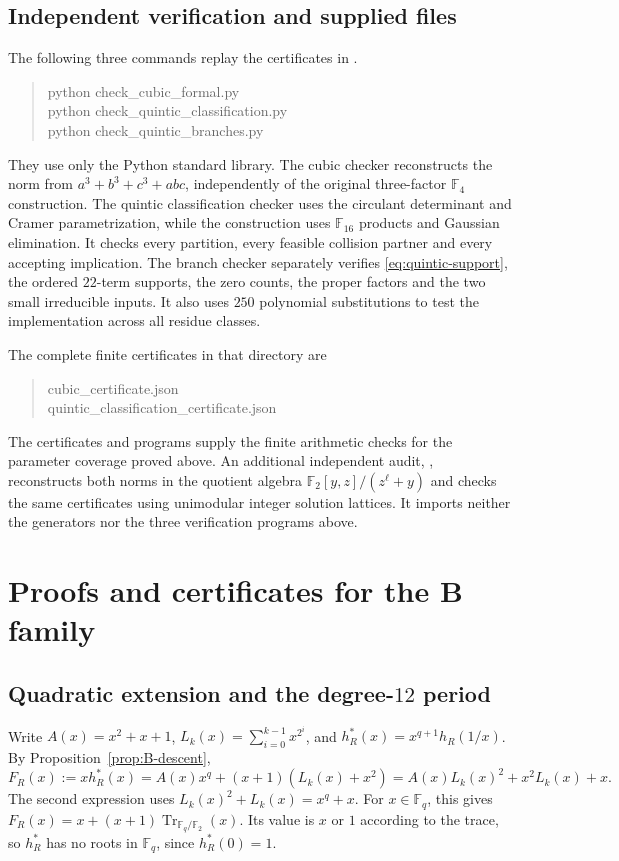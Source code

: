 \documentclass[11pt]{article}
\theoremstyle{definition}
\theoremstyle{remark}
\begin{document}
\begin{samepage}
\subsection{Independent verification and supplied files}
The following three commands replay the certificates in .
\begin{quote}\small\ttfamily
python check\_cubic\_formal.py\\
python check\_quintic\_classification.py\\
python check\_quintic\_branches.py
\end{quote}
\end{samepage}
They use only the Python standard library.
The cubic checker reconstructs the norm from
$a^3+b^3+c^3+abc$, independently of the original
three-factor $\mathbb F_4$ construction.
The quintic classification checker uses the circulant determinant
and Cramer parametrization, while the construction uses
$\mathbb F_{16}$ products and Gaussian elimination.
It checks every partition, every feasible collision partner and
every accepting implication.
The branch checker separately verifies
\eqref{eq:quintic-support}, the ordered $22$-term supports,
the zero counts, the proper factors and the two small irreducible
inputs. It also uses $250$ polynomial substitutions to test the
implementation across all residue classes.

The complete finite certificates in that directory are
\begin{quote}\small\ttfamily
cubic\_certificate.json\\
quintic\_classification\_certificate.json
\end{quote}
The certificates and programs supply the finite arithmetic checks
for the parameter coverage proved above.
An additional independent audit, ,
reconstructs both norms in the quotient algebra
$\mathbb F_2[y,z]/(z^\ell+y)$ and checks the same certificates using
unimodular integer solution lattices. It imports neither the generators
nor the three verification programs above.


\section{Proofs and certificates for the B family}\label{sec:B-certificates}

\subsection{Quadratic extension and the degree-\texorpdfstring{$12$}{12} period}
Write $A(x)=x^2+x+1$, $L_k(x)=\sum_{i=0}^{k-1}x^{2^i}$,
and $h_R^*(x)=x^{q+1}h_R(1/x)$. By Proposition~\ref{prop:B-descent},
\begin{equation}\label{eq:B-reciprocal}
 F_R(x):=x h_R^*(x)=A(x)x^q+(x+1)(L_k(x)+x^2)
                  =A(x)L_k(x)^2+x^2L_k(x)+x.
\end{equation}
The second expression uses $L_k(x)^2+L_k(x)=x^q+x$.
For $x\in\mathbb F_q$, this gives
$F_R(x)=x+(x+1)\operatorname{Tr}_{\mathbb F_q/\mathbb F_2}(x)$.
Its value is $x$ or $1$ according to the trace, so $h_R^*$ has no
roots in $\mathbb F_q$, since $h_R^*(0)=1$.
\end{document}
